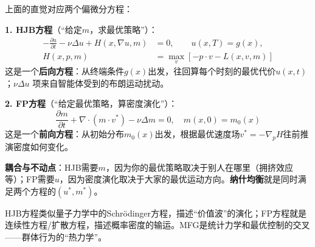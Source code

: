 上面的直觉对应两个偏微分方程：

\begin{keyformula}[title=平均场博弈方程组]
\textbf{1. HJB方程}（``给定$m$，求最优策略''）：
\begin{equation}
\begin{aligned}
    -\frac{\partial u}{\partial t} - \nu \Delta u + H(x, \nabla u, m) &= 0, \qquad u(x, T) = g(x), \\
    H(x, p, m) &= \max_v \left[ -p \cdot v - L(x, v, m) \right]
\end{aligned}
\end{equation}
这是一个\textbf{后向方程}：从终端条件$g(x)$出发，往回算每个时刻的最优代价$u(x,t)$；$\nu \Delta u$ 项来自智能体受到的布朗运动扰动。

\textbf{2. FP方程}（``给定最优策略，算密度演化''）：
\begin{equation}
    \frac{\partial m}{\partial t} + \nabla \cdot (m \cdot v^*) - \nu \Delta m = 0, \quad m(x, 0) = m_0(x)
\end{equation}
这是一个\textbf{前向方程}：从初始分布$m_0(x)$出发，根据最优速度场$v^* = -\nabla_p H$往前推演密度如何变化。

\textbf{耦合与不动点}：HJB需要$m$，因为你的最优策略取决于别人在哪里（拥挤效应等）；FP需要$u$，因为密度演化取决于大家的最优运动方向。\textbf{纳什均衡}就是同时满足两个方程的$(u^*, m^*)$。
\end{keyformula}

\begin{remark}[物理直觉]
HJB方程类似量子力学中的Schrödinger方程，描述``价值波''的演化；FP方程就是连续性方程/扩散方程，描述概率密度的输运。MFG是统计力学和最优控制的交叉——群体行为的``热力学''。
\end{remark}

